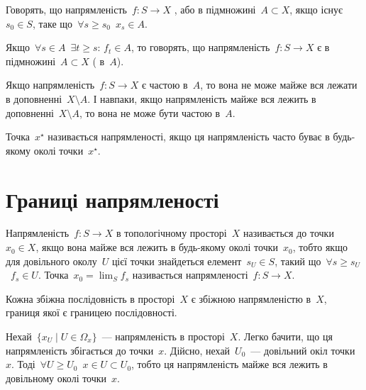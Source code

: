 \begin{definition}
    Говорять, що напрямленість~$f : S \to X$ , або  в підмножині~$A \subset X$, якщо існує~$s_0 \in S$, таке що~$\forall s \ge s_0$~$x_s \in A$.
\end{definition}

\begin{definition}
    Якщо~$\forall s \in A$~$\exists t \ge s$: $f_t \in A$, то говорять, що напрямленість~$f: S \to X$ є  в підмножині~$A \subset X$ ( в~$A$).
\end{definition}

\begin{remark}
    Якщо напрямленість~$f: S \to X$ є частою в~$A$, то вона не може майже вся лежати в доповненні~$X \setminus A$. І навпаки, якщо напрямленість майже вся лежить в доповненні~$X \setminus A$, то вона не може бути частою в~$A$.
\end{remark}

\begin{definition}
    Точка~$x^\star$ називається  напрямленості, якщо ця напрямленість часто буває в будь-якому околі точки~$x^\star$.
\end{definition}

\section{Границі напрямленості}

\begin{definition}
    Напрямленість~$f: S \to X$ в топологічному просторі~$X$ називається  до точки~$x_0 \in X$, якщо вона майже вся лежить в будь-якому околі точки~$x_0$, тобто якщо для довільного околу~$U$ цієї точки знайдеться елемент~$s_U \in S$, такий що~$\forall s \ge s_U$~$f_s \in U$. Точка~$x_0 = \lim_S f_s$ називається  напрямленості~$f: S \to X$.
\end{definition}

\begin{example}
    Кожна збіжна послідовність в просторі~$X$ є збіжною напрямленістю в~$X$, границя якої є границею послідовності.
\end{example}

\begin{example}
    Нехай~$\{x_U \mid U \in \Omega_x\}$~--- напрямленість в просторі~$X$. Легко бачити, що ця напрямленість збігається до точки~$x$. Дійсно, нехай~$U_0$~--- довільний окіл точки~$x$. Тоді~$\forall U \ge U_0$~$x \in U \subset U_0$, тобто ця напрямленість майже вся лежить в довільному околі точки~$x$.
\end{example}

